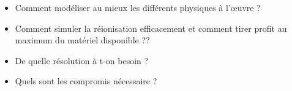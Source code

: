 \begin{itemize}
\item Comment modéliser au mieux les différents physiques à l’œuvre ?
\item Comment simuler la réionisation efficacement et comment tirer profit au maximum du matériel disponible ??
\item De quelle résolution à t-on besoin ?
\item Quels sont les compromis nécessaire ?
\end{itemize}

%
%
%




